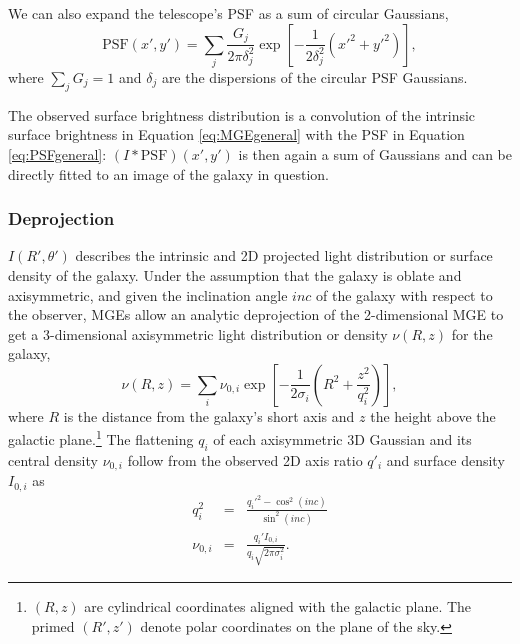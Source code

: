 \documentclass[useAMS,usenatbib]{mnras}
\begin{document}
We can also expand the telescope's PSF as a sum of circular Gaussians,
\begin{equation}
\text{PSF}(x',y') = \sum_j \frac{G_j}{2 \pi \delta_j^2} \exp\left[- \frac{1}{2 \delta_j^2} \left({x'}^2 + {y'}^2 \right)\right], \label{eq:PSFgeneral}
\end{equation}
where $\sum_j G_j = 1$ and $\delta_j$ are the dispersions of the circular PSF Gaussians. 

The observed surface brightness distribution is a convolution of the intrinsic surface brightness in Equation \eqref{eq:MGEgeneral} with the PSF in Equation \eqref{eq:PSFgeneral}: $(I \ast \text{PSF}) (x',y')$ is then again a sum of Gaussians and can be directly fitted to an image of the galaxy in question.

\subsubsection{Deprojection} \label{sec:MGE_theo_deprojection}

$I(R',\theta')$ describes the intrinsic and 2D projected light distribution or surface density of the galaxy. Under the assumption that the galaxy is oblate and axisymmetric, and given the inclination angle $inc$ of the galaxy with respect to the observer, MGEs allow an analytic deprojection of the 2-dimensional MGE to get a 3-dimensional axisymmetric light distribution or density $\nu(R,z)$ for the galaxy,
\begin{equation}
\nu(R,z) = \sum_i \nu_{0,i} \exp \left[-\frac{1}{2\sigma_i}\left(R^2 + \frac{z^2}{q_i^2} \right) \right], \label{eq:deprojMGE}
\end{equation}
where $R$ is the distance from the galaxy's short axis and $z$ the height above the galactic plane.\footnote{$(R,z)$ are cylindrical coordinates aligned with the galactic plane. The primed $(R',z')$ denote polar coordinates on the plane of the sky.} The flattening $q_i$ of each axisymmetric 3D Gaussian and its central density $\nu_{0,i}$ follow from the observed 2D axis ratio $q'_i$ and surface density $I_{0,i}$ as
\begin{eqnarray}
q_i^2 &=& \frac{q_i'^2 - \cos^2 (inc)}{\sin^2 (inc)}\\
\nu_{0,i} &=& \frac{q_i' I_{0,i}}{q_i \sqrt{2 \pi \sigma_i^2}}.
\end{eqnarray}
\end{document}

